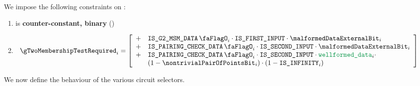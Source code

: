 We impose the following constraints on \gTwoMembershipTestRequired{}:
\begin{enumerate}
    \item \gTwoMembershipTestRequired{} is \textbf{counter-constant, binary} \quad (\trash)
    \item 
        \[
            \gTwoMembershipTestRequired_{i} = 
            \left[ \begin{array}{cl} 
                + & \isBlsGTwoMsmData_{i} \cdot \isFirstInput \cdot \malformedDataExternalBit_{i}  \\
                + & \isBlsPairingCheckData_{i} \cdot \isSecondInput \cdot \malformedDataExternalBit_{i} \\
                + & \isBlsPairingCheckData_{i} \cdot \isSecondInput \cdot \locWellformedData_{i} \cdot \\
                & (1 - \nontrivialPairOfPointsBit_{i}) \cdot (1 - \isInfinity_{i}) \\
            \end{array} \right] \\
        \]
\end{enumerate}
We now define the behaviour of the various circuit selectors.

